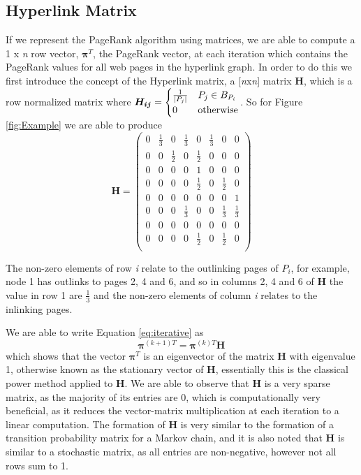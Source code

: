 \documentclass[11pt]{report}
\begin{document}
\subsection{Hyperlink Matrix} \label{sec:hyperlink}
If we represent the PageRank algorithm using matrices, we are able to compute a 1 x \textit{n} row vector, $\boldsymbol{\pi}^T$, the PageRank vector, at each iteration which contains the PageRank values for all web pages in the hyperlink graph. In order to do this we first introduce the concept of the Hyperlink matrix, a [\textit{n}x\textit{n}] matrix \textbf{H}, which is a row normalized matrix where 
\(\boldsymbol{H_{ij}} = \begin{cases} \frac{1}{\vert P_j \vert} & P_j\in B_{P_i } \\ 0 & \textnormal{otherwise} \end{cases}\). So for Figure \ref{fig:Example} we are able to produce 
\[\textbf{H}=\left(
\begin{array}{cccccccc}
0 & \frac{1}{3} & 0 & \frac{1}{3} & 0 &\frac{1}{3} & 0& 0 \\
0 & 0 &\frac{1}{2}& 0 &\frac{1}{2}& 0 & 0 & 0\\
0 & 0 & 0 & 0 & 1 & 0 & 0 & 0\\
0 & 0 & 0 & 0 & \frac{1}{2} & 0 & \frac{1}{2} & 0\\
0 & 0 & 0 & 0 & 0 & 0 & 0 & 1\\
0 & 0 & 0 & \frac{1}{3} & 0 & 0 & \frac{1}{3} & \frac{1}{3} \\
0 & 0 & 0 & 0 & 0 & 0 & 0 & 0\\
0 & 0 & 0 & 0 & \frac{1}{2} & 0 & \frac{1}{2} & 0\\
\end{array}
\right)	\]

The non-zero elements of row \textit{i} relate to the outlinking pages of $P_i$, for example, node 1 has outlinks to pages 2, 4 and 6, and so in columns 2, 4 and 6 of \textbf{H} the value in row 1 are $\frac{1}{3}$ and the non-zero elements of column \textit{i} relates to the inlinking pages.

We are able to write Equation \eqref{eq:iterative} as \begin{equation} \label{eq:power H}
\boldsymbol\pi^{(k+1)T} = \boldsymbol\pi^{(k)T}\textbf{H}
\end{equation}  which shows that the vector $\boldsymbol\pi^T$ is an eigenvector of the matrix \textbf{H} with eigenvalue 1, otherwise known as the stationary vector of \textbf{H}, essentially this is the classical power method applied to \textbf{H}. We are able to observe that \textbf{H} is a very sparse matrix, as the majority of its entries are 0, which is computationally very beneficial, as it reduces the vector-matrix multiplication at each iteration to a linear computation. The formation of \textbf{H} is very similar to the formation of a transition probability matrix for a Markov chain, and it is also noted that \textbf{H} is similar to a stochastic matrix, as all entries are non-negative, however not all rows sum to 1.
\end{document}
